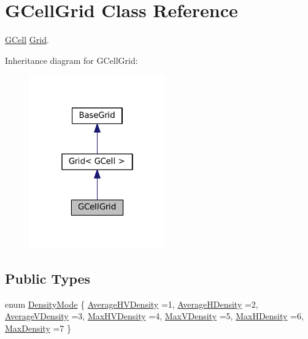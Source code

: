 \hypertarget{classKatabatic_1_1GCellGrid}{}\section{G\+Cell\+Grid Class Reference}
\label{classKatabatic_1_1GCellGrid}


\mbox{\hyperlink{classKatabatic_1_1GCell}{G\+Cell}} \mbox{\hyperlink{classKatabatic_1_1Grid}{Grid}}.  




Inheritance diagram for G\+Cell\+Grid\+:\nopagebreak
\begin{figure}[H]
\begin{center}
\leavevmode
\includegraphics[width=166pt]{classKatabatic_1_1GCellGrid__inherit__graph}
\end{center}
\end{figure}
\subsection*{Public Types}
\begin{DoxyCompactItemize}
\item 
enum \mbox{\hyperlink{classKatabatic_1_1GCellGrid_a07884f5e1af410e98208fed76a2b40fe}{Density\+Mode}} \{ \newline
\mbox{\hyperlink{classKatabatic_1_1GCellGrid_a07884f5e1af410e98208fed76a2b40fead15bf3e5b63f398d76d717a088acd310}{Average\+H\+V\+Density}} =1, 
\newline
\mbox{\hyperlink{classKatabatic_1_1GCellGrid_a07884f5e1af410e98208fed76a2b40feaec0ad06385eae8d1e2dee4f3c9f9f4ed}{Average\+H\+Density}} =2, 
\newline
\mbox{\hyperlink{classKatabatic_1_1GCellGrid_a07884f5e1af410e98208fed76a2b40fead1a1d89017d10aeb63d1c05b6fb650dd}{Average\+V\+Density}} =3, 
\newline
\mbox{\hyperlink{classKatabatic_1_1GCellGrid_a07884f5e1af410e98208fed76a2b40fea8265e053af0708a508ecbce86d1a8165}{Max\+H\+V\+Density}} =4, 
\newline
\mbox{\hyperlink{classKatabatic_1_1GCellGrid_a07884f5e1af410e98208fed76a2b40fea5f0a89ca367ef98550eaa86c1e32c873}{Max\+V\+Density}} =5, 
\newline
\mbox{\hyperlink{classKatabatic_1_1GCellGrid_a07884f5e1af410e98208fed76a2b40fea2a6d29b012cc89026c3c0061f87a4f03}{Max\+H\+Density}} =6, 
\newline
\mbox{\hyperlink{classKatabatic_1_1GCellGrid_a07884f5e1af410e98208fed76a2b40fea90a2f4a4ee8558de9f99458ddeab852c}{Max\+Density}} =7
 \}
\end{DoxyCompactItemize}
